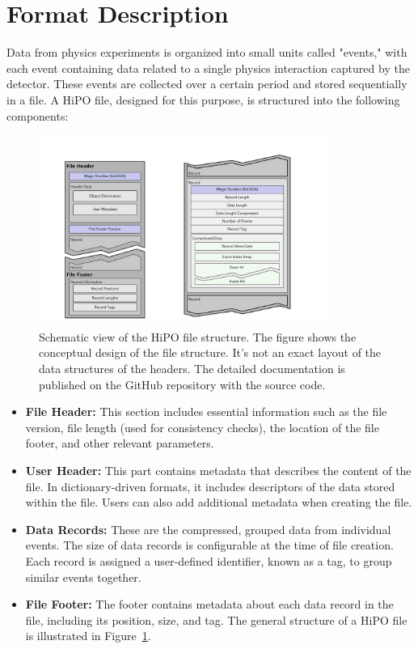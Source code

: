 \section{Format Description}

Data from physics experiments is organized into small units called "events," with each event containing data related to a single physics interaction captured by the detector. These events are collected over a certain period and stored sequentially in a file. A HiPO file, designed for this purpose, is structured into the following components:

\begin{figure}[h!]
  \begin{center}
    \includegraphics[width=0.85\textwidth]{images/file_structure.pdf}
 \end{center}
  \caption{Schematic view of the HiPO file structure. The figure shows the conceptual design of the file structure. It's not an exact layout of the data structures of the headers. The detailed documentation is published on the GitHub repository with the source code.}
 \label{schema:file}
\end{figure}


\begin{itemize}
\item {\bf File Header:} This section includes essential information such as the file version, file length (used for consistency checks), the location of the file footer, and other relevant parameters.
\item {\bf User Header:} This part contains metadata that describes the content of the file. In dictionary-driven formats, it includes descriptors of the data stored within the file. Users can also add additional metadata when creating the file.
\item {\bf Data Records:} These are the compressed, grouped data from individual events. The size of data records is configurable at the time of file creation. Each record is assigned a user-defined identifier, known as a tag, to group similar events together.
\item {\bf File Footer:} The footer contains metadata about each data record in the file, including its position, size, and tag.
The general structure of a HiPO file is illustrated in Figure~\ref{schema:file}.
\end{itemize}

